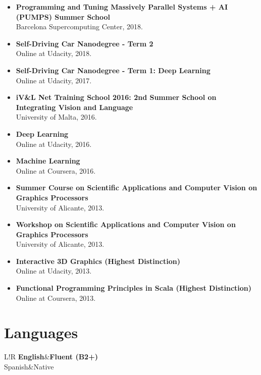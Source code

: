\documentclass[8pt]{article}
\newcommand\VRule{\color{lightgray}\vrule width 0.5pt}
\begin{document}
\begin{itemize}
	\item \textbf{Programming and Tuning Massively Parallel Systems + AI (PUMPS) Summer School}\\ Barcelona Supercomputing Center, 2018.
	\item \textbf{Self-Driving Car Nanodegree - Term 2}\\ Online at Udacity, 2018.
	\item \textbf{Self-Driving Car Nanodegree - Term 1: Deep Learning}\\ Online at Udacity, 2017.
	\item \textbf{iV\&L Net Training School 2016: 2nd Summer School on Integrating Vision and Language}\\ University of Malta, 2016.
	\item \textbf{Deep Learning}\\ Online at Udacity, 2016.
	\item \textbf{Machine Learning}\\ Online at Coursera, 2016.
	\item \textbf{Summer Course on Scientific Applications and Computer Vision on Graphics Processors}\\ University of Alicante, 2013.
	\item \textbf{Workshop on Scientific Applications and Computer Vision on Graphics Processors}\\ University of Alicante, 2013.	
	\item \textbf{Interactive 3D Graphics (Highest Distinction)}\\
	Online at Udacity, 2013.
	\item \textbf{Functional Programming Principles in Scala (Highest Distinction)}\\
	Online at Coursera, 2013.
\end{itemize}

\section*{Languages}
\begin{tabular}{L!{\VRule}R}
{\bf English}&{\bf Fluent (B2+)}\\
{Spanish}&{Native}\\
\end{tabular}
\end{document}
